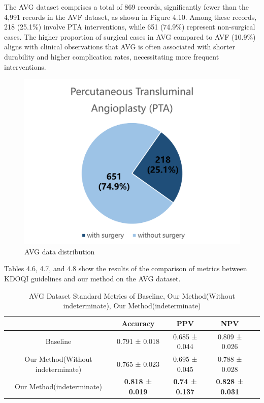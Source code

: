 The AVG dataset comprises a total of 869 records, significantly fewer than the 4,991 records in the AVF dataset, as shown in Figure 4.10. Among these records, 218 (25.1\%) involve PTA interventions, while 651 (74.9\%) represent non-surgical cases. The higher proportion of surgical cases in AVG compared to AVF (10.9\%) aligns with clinical observations that AVG is often associated with shorter durability and higher complication rates, necessitating more frequent interventions.

\begin{figure}[H]
    \centering
    \includegraphics[width=0.7\linewidth]{figures/AVG data distribution.png}
    \caption{AVG data distribution}
    \label{fig:enter-label}
\end{figure}

Tables 4.6, 4.7, and 4.8 show the results of the comparison of metrics between KDOQI guidelines and our method on the AVG dataset.

\begin{table}[h]
\centering
\caption[AVG Dataset Standard Metrics of Baseline, Our Method(Without indeterminate), Our Method(indeterminate)]{AVG Dataset Standard Metrics of Baseline, Our Method(Without indeterminate), Our Method(indeterminate)}
\label{Standard Metrics AVG}
\begin{tabular}{ccccc}
\toprule[1.1pt]
                      & Accuracy & PPV & NPV \\
\midrule[1.1pt]
\multirow{1}{*}{Baseline} & 0.791 ± 0.018 &0.685 ± 0.044 & 0.809 ± 0.026 & \\
\midrule
\multirow{1}{*}{Our Method(Without indeterminate)} & 0.765 ± 0.023 & 0.695 ± 0.045 & 0.788 ± 0.028 \\
\midrule
\multirow{1}{*}{Our Method(indeterminate)} & \textbf{0.818 ± 0.019} & \textbf{0.74 ± 0.137} & \textbf{0.828 ± 0.031} \\

\bottomrule[1.1pt]
\end{tabular}
\end{table}


